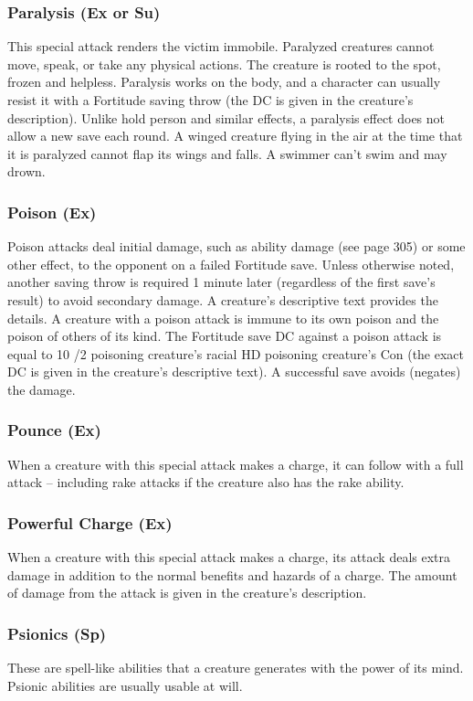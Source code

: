 \subsubsection{Paralysis (Ex or Su)} This special attack renders the victim immobile. Paralyzed creatures cannot move, speak, or take any physical actions. The creature is rooted to the spot, frozen and helpless. Paralysis works on the body, and a character can usually resist it with a Fortitude saving throw (the DC is given in the creature's description). Unlike hold person and similar effects, a paralysis effect does not allow a new save each round. A winged creature flying in the air at the time that it is paralyzed cannot flap its wings and falls. A swimmer can't swim and may drown. 

\subsubsection{Poison (Ex)} Poison attacks deal initial damage, such as ability damage (see page 305) or some other effect, to the opponent on a failed Fortitude save. Unless otherwise noted, another saving throw is required 1 minute later (regardless of the first save's result) to avoid secondary damage. A creature's descriptive text provides the details.
A creature with a poison attack is immune to its own poison and the poison of others of its kind.
The Fortitude save DC against a poison attack is equal to 10 /2 poisoning creature's racial HD \add poisoning creature's Con (the exact DC is given in the creature's descriptive text).
A successful save avoids (negates) the damage.

\subsubsection{Pounce (Ex)} When a creature with this special attack makes a charge, it can follow with a full attack -- including rake attacks if the creature also has the rake ability.

\subsubsection{Powerful Charge (Ex)} When a creature with this special attack makes a charge, its attack deals extra damage in addition to the normal benefits and hazards of a charge. The amount of damage from the attack is given in the creature's description.

\subsubsection{Psionics (Sp)} These are spell-like abilities that a creature generates with the power of its mind. Psionic abilities are usually usable at will.

